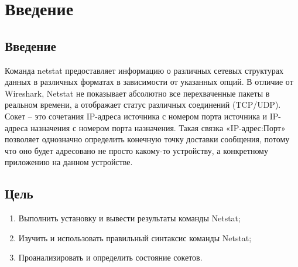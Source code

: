\chapter{Введение}
\label{ch:intro}

\section{Введение}

Команда netstat предоставляет информацию о различных сетевых структурах данных в
различных форматах в зависимости от указанных опций. В отличие от Wireshark, Netstat не
показывает абсолютно все перехваченные пакеты в реальном времени, а отображает статус
различных соединений (TCP/UDP). \\

Сокет – это сочетания IP-адреса источника с номером порта источника и IP-адреса
назначения с номером порта назначения. Такая связка «IP-адрес:Порт» позволяет однозначно
определить конечную точку доставки сообщения, потому что оно будет адресовано не просто
какому-то устройству, а конкретному приложению на данном устройстве.


\section{Цель}  

\begin{enumerate}
    \item Выполнить установку и вывести результаты команды Netstat;
    \item Изучить и использовать правильный синтаксис команды Netstat;
    \item Проанализировать и определить состояние сокетов.
\end{enumerate}

\endinput 